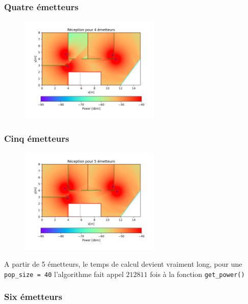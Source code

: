 \documentclass[sn-mathphys-num]{sn-jnl}
\begin{document}
\subsubsection{Quatre émetteurs}
\label{sub-4}

\begin{figure}[H]
    \centering
    \includegraphics[width=0.6\textwidth]{images/optimize/4_dbm.png}
\end{figure}

\subsubsection{Cinq émetteurs}
\label{sub-5}

\begin{figure}[H]
    \centering
    \includegraphics[width=0.6\textwidth]{images/optimize/5_dbm.png}
\end{figure}

A partir de 5 émetteurs, le temps de calcul devient vraiment long,
pour une \texttt{pop\_size = 40} l'algorithme fait appel $212811$ fois à la 
fonction \texttt{get\_power()}

\subsubsection{Six émetteurs}
\label{sub-6}
\end{document}
